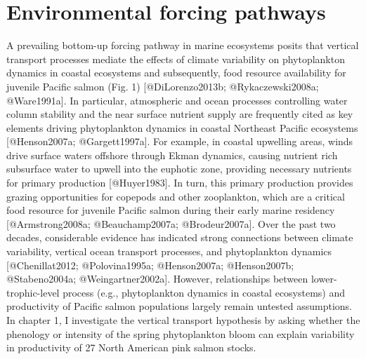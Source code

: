 \section{Environmental forcing
pathways}\label{environmental-forcing-pathways}

A prevailing bottom-up forcing pathway in marine ecosystems posits that
vertical transport processes mediate the effects of climate variability
on phytoplankton dynamics in coastal ecosystems and subsequently, food
resource availability for juvenile Pacific salmon (Fig. 1)
{[}@DiLorenzo2013b; @Rykaczewski2008a; @Ware1991a{]}. In particular,
atmospheric and ocean processes controlling water column stability and
the near surface nutrient supply are frequently cited as key elements
driving phytoplankton dynamics in coastal Northeast Pacific ecosystems
{[}@Henson2007a; @Gargett1997a{]}. For example, in coastal upwelling
areas, winds drive surface waters offshore through Ekman dynamics,
causing nutrient rich subsurface water to upwell into the euphotic zone,
providing necessary nutrients for primary production {[}@Huyer1983{]}.
In turn, this primary production provides grazing opportunities for
copepods and other zooplankton, which are a critical food resource for
juvenile Pacific salmon during their early marine residency
{[}@Armstrong2008a; @Beauchamp2007a; @Brodeur2007a{]}. Over the past two
decades, considerable evidence has indicated strong connections between
climate variability, vertical ocean transport processes, and
phytoplankton dynamics {[}@Chenillat2012; @Polovina1995a; @Henson2007a;
@Henson2007b; @Stabeno2004a; @Weingartner2002a{]}. However,
relationships between lower-trophic-level process (e.g., phytoplankton
dynamics in coastal ecosystems) and productivity of Pacific salmon
populations largely remain untested assumptions. In chapter 1, I
investigate the vertical transport hypothesis by asking whether the
phenology or intensity of the spring phytoplankton bloom can explain
variability in productivity of 27 North American pink salmon stocks.

